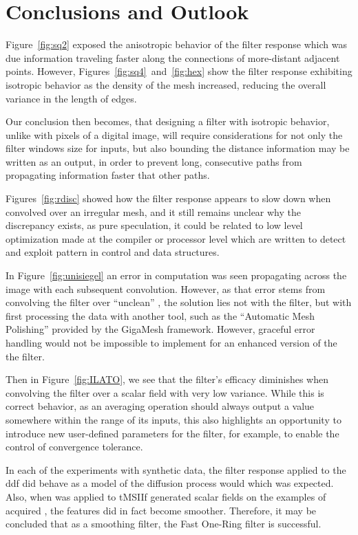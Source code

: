 \chapter{Conclusions and Outlook}
\label{ch7}
Figure~\ref{fig:sq2} exposed the anisotropic behavior of the filter response which was due information traveling faster along the connections of more-distant adjacent points. However, Figures~\ref{fig:sq4}~and~\ref{fig:hex} show the filter response exhibiting isotropic behavior as the density of the mesh increased, reducing the overall variance in the length of edges.

Our conclusion then becomes, that designing a filter with isotropic behavior, unlike with pixels of a digital image, will require considerations for not only the filter windows size for inputs, but also bounding the distance information may be written as an output, in order to prevent long, consecutive paths from propagating information faster that other paths.

Figures~\ref{fig:rdisc} showed how the filter response appears to slow down when convolved over an irregular mesh, and it still remains unclear why the discrepancy exists, as pure speculation, it could be related to low level optimization made at the compiler or processor level which are written to detect and exploit pattern in control and data structures.

In Figure~\ref{fig:unisiegel} an error in computation was seen propagating across the image with each subsequent convolution. However, as that error stems from convolving the filter over ``unclean'' \tdd{}, the solution lies not with the filter, but with first processing the data with another tool, such as the ``Automatic Mesh Polishing'' provided by the GigaMesh framework. However, graceful error handling would not be impossible to implement for an enhanced version of the the filter.

Then in Figure~\ref{fig:ILATO}, we see that the filter's efficacy diminishes when convolving the filter over a scalar field with very low variance. While this is correct behavior, as an averaging operation should always output a value somewhere within the range of its inputs, this also highlights an opportunity to introduce new user-defined parameters for the filter, for example, to enable the control of convergence tolerance.

In each of the experiments with synthetic data, the filter response applied to the \gls{ddf} did behave as a model of the diffusion process would which was expected. Also, when  was applied to \gls{tMSIIf} generated scalar fields on the examples of acquired \tdd{}, the features did in fact become smoother. Therefore, it may be concluded that as a smoothing filter, the Fast One-Ring filter is successful.

